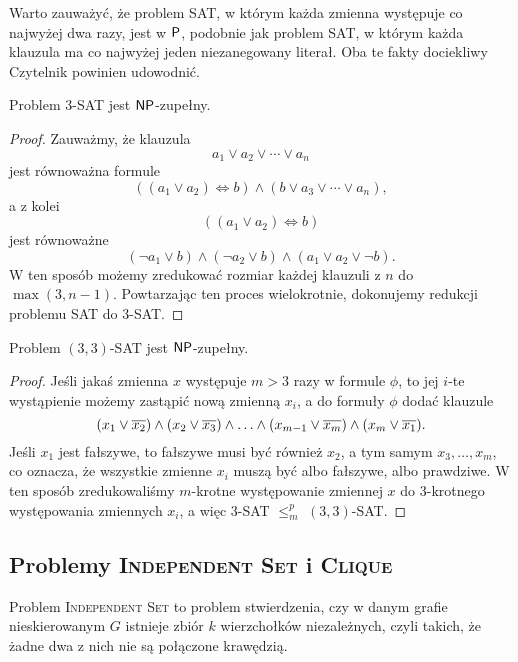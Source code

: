 Warto zauważyć, że problem SAT, w którym każda zmienna występuje co najwyżej dwa razy, jest w $\textsf{P}$, podobnie jak problem SAT, w którym każda klauzula ma co najwyżej jeden niezanegowany literał. Oba te fakty dociekliwy Czytelnik powinien udowodnić.

\begin{theorem}\label{t:3-SAT}
    Problem 3-SAT jest $\textsf{NP}$-zupełny.
\end{theorem}
\begin{proof}
    Zauważmy, że klauzula
    \[ a_1 \lor a_2 \lor \cdots \lor a_n \]
    jest równoważna formule
    \[ ((a_1 \lor a_2) \Leftrightarrow b) \land (b \lor a_3 \lor \cdots \lor a_n), \]
    a z kolei
    \[ ((a_1 \lor a_2) \Leftrightarrow b) \]
    jest równoważne
    \[ (\neg a_1 \lor b) \land (\neg a_2 \lor b) \land (a_1 \lor a_2 \lor \neg b). \]
    W ten sposób możemy zredukować rozmiar każdej klauzuli z $n$ do $\max(3, n-1)$. Powtarzając ten proces wielokrotnie, dokonujemy redukcji problemu SAT do 3-SAT.
\end{proof}

\begin{theorem}\label{t:3,3-SAT}
    Problem $(3, 3)$-SAT jest $\textsf{NP}$-zupełny.
\end{theorem}
\begin{proof}
    Jeśli jakaś zmienna $x$ występuje $m > 3$ razy w formule $\phi$, to jej $i$-te wystąpienie możemy zastąpić nową zmienną $x_i$, a do formuły $\phi$ dodać klauzule
    \[ (x_1 \lor \overline{x_2}) \land (x_2 \lor \overline{x_3}) \land \ldots \land (x_{m-1} \lor \overline{x_m}) \land (x_m \lor \overline{x_1}). \]
    Jeśli $x_1$ jest fałszywe, to fałszywe musi być również $x_2$, a tym samym $x_3, \ldots, x_m$, co oznacza, że wszystkie zmienne $x_i$ muszą być albo fałszywe, albo prawdziwe. W ten sposób zredukowaliśmy $m$-krotne występowanie zmiennej $x$ do 3-krotnego występowania zmiennych $x_i$, a więc 3-SAT $\leq_m^p$ $(3, 3)$-SAT.
\end{proof}

\subsection{Problemy \textsc{Independent Set} i \textsc{Clique}}

Problem \textsc{Independent Set} to problem stwierdzenia, czy w danym grafie nieskierowanym $G$ istnieje zbiór $k$ wierzchołków niezależnych, czyli takich, że żadne dwa z nich nie są połączone krawędzią.

